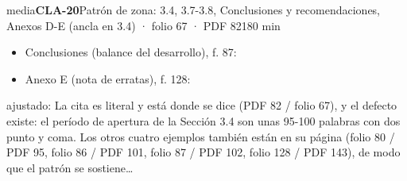 \begin{ficha}{media}{\casilla\textbf{CLA-20}\quad{}\quad Patrón de zona: 3.4, 3.7-3.8, Conclusiones y recomendaciones, Anexos D-E (ancla en 3.4) · folio 67 · PDF 82\hfill 180 min}
\begin{itemize}[leftmargin=1.2em,itemsep=1pt,topsep=1pt]
\item {\small Conclusiones (balance del desarrollo), f. 87: }
\item {\small Anexo E (nota de erratas), f. 128: }
\end{itemize}
{\footnotesize\color{gris}ajustado: La cita es literal y está donde se dice (PDF 82 /\allowbreak{} folio 67), y el defecto existe: el período de apertura de la Sección 3.4 son unas 95-100 palabras con dos punto y coma. Los otros cuatro ejemplos también están en su página (folio 80 /\allowbreak{} PDF 95, folio 86 /\allowbreak{} PDF 101, folio 87 /\allowbreak{} PDF 102, folio 128 /\allowbreak{} PDF 143), de modo que el patrón se sostiene…\par}
\end{ficha}
